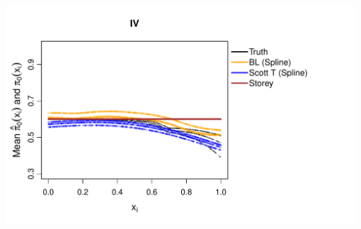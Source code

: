 \documentclass{article}\usepackage[]{graphicx}\usepackage[]{color}
\makeatletter
\def\maxwidth{ %
  \ifdim\Gin@nat@width>\linewidth
    \linewidth
  \else
    \Gin@nat@width
  \fi
}
\newenvironment{knitrout}{}{} %
\makeatother
\begin{document}
\begin{knitrout}
{\includegraphics[width=\maxwidth]{Figures/plot_of_mean_estimates_t-7} 

}



\end{knitrout}
\end{document}
